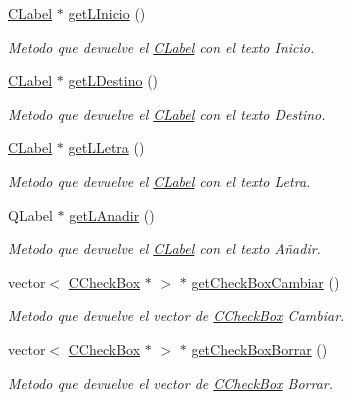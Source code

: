 \begin{DoxyCompactItemize}
\hyperlink{classCLabel}{C\+Label} $\ast$ \hyperlink{classCAsistenteCodificacion_a63fcc7bde25a4dc813d81f6591997989}{get\+L\+Inicio} ()
\begin{DoxyCompactList}\small\item\em Metodo que devuelve el \hyperlink{classCLabel}{C\+Label} con el texto \textquotesingle{}Inicio\textquotesingle{}. \end{DoxyCompactList}\item 
\hyperlink{classCLabel}{C\+Label} $\ast$ \hyperlink{classCAsistenteCodificacion_abb26c06c814cf91080a1b9d83400a77d}{get\+L\+Destino} ()
\begin{DoxyCompactList}\small\item\em Metodo que devuelve el \hyperlink{classCLabel}{C\+Label} con el texto \textquotesingle{}Destino\textquotesingle{}. \end{DoxyCompactList}\item 
\hyperlink{classCLabel}{C\+Label} $\ast$ \hyperlink{classCAsistenteCodificacion_adf8377459fe4ec5cf0a963fd9282420e}{get\+L\+Letra} ()
\begin{DoxyCompactList}\small\item\em Metodo que devuelve el \hyperlink{classCLabel}{C\+Label} con el texto \textquotesingle{}Letra\textquotesingle{}. \end{DoxyCompactList}\item 
Q\+Label $\ast$ \hyperlink{classCAsistenteCodificacion_a7cdb8dcc5d3027177721fc628e3c53ae}{get\+L\+Anadir} ()
\begin{DoxyCompactList}\small\item\em Metodo que devuelve el \hyperlink{classCLabel}{C\+Label} con el texto \textquotesingle{}Añadir\textquotesingle{}. \end{DoxyCompactList}\item 
vector$<$ \hyperlink{classCCheckBox}{C\+Check\+Box} $\ast$ $>$ $\ast$ \hyperlink{classCAsistenteCodificacion_af5c7ebbcf38b72cb912ccec2c4309323}{get\+Check\+Box\+Cambiar} ()
\begin{DoxyCompactList}\small\item\em Metodo que devuelve el vector de \hyperlink{classCCheckBox}{C\+Check\+Box} Cambiar. \end{DoxyCompactList}\item 
vector$<$ \hyperlink{classCCheckBox}{C\+Check\+Box} $\ast$ $>$ $\ast$ \hyperlink{classCAsistenteCodificacion_aba95e5e21d3f5cccad79139fc7ffbe7e}{get\+Check\+Box\+Borrar} ()
\begin{DoxyCompactList}\small\item\em Metodo que devuelve el vector de \hyperlink{classCCheckBox}{C\+Check\+Box} Borrar. \end{DoxyCompactList}\item 

\end{DoxyCompactItemize}
